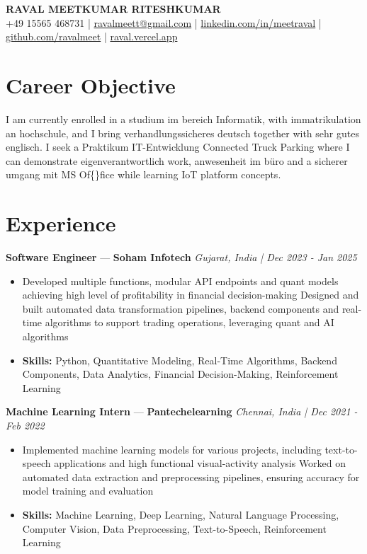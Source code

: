 \documentclass[a4paper,10pt]{article}
\begin{document}
\begin{center}
  {\Large\bfseries RAVAL MEETKUMAR RITESHKUMAR}\\[2pt]
  {\small +49 15565 468731 \;|\; \href{mailto:ravalmeett@gmail.com}{ravalmeett@gmail.com} \;|\; \href{https://www.linkedin.com/in/meetraval/}{linkedin.com/in/meetraval} \;|\; \href{https://github.com/ravalmeet}{github.com/ravalmeet} \;|\; \href{https://raval.vercel.app/}{raval.vercel.app}}
\end{center}
\vspace{-3pt}

\section*{Career Objective}
I am currently enrolled in a studium im bereich Informatik, with immatrikulation an hochschule, and I bring verhandlungssicheres deutsch together with sehr gutes englisch. I seek a Praktikum IT-Entwicklung Connected Truck Parking where I can demonstrate eigenverantwortlich work, anwesenheit im büro and a sicherer umgang mit MS Of\{\}fice while learning IoT platform concepts.\par

\section*{Experience}
\textbf{Software Engineer} — \textbf{Soham Infotech} \hfill \textit{Gujarat, India \;|\; Dec 2023 - Jan 2025}\par
\vspace{1pt}
\begin{itemize}
  \item Developed multiple functions, modular API endpoints and quant models achieving high level of profitability in financial decision-making Designed and built automated data transformation pipelines, backend components and real-time algorithms to support trading operations, leveraging quant and AI algorithms
  \item \textbf{Skills:} Python, Quantitative Modeling, Real-Time Algorithms, Backend Components, Data Analytics, Financial Decision-Making, Reinforcement Learning
\end{itemize}
\vspace{3pt}
\textbf{Machine Learning Intern} — \textbf{Pantechelearning} \hfill \textit{Chennai, India \;|\; Dec 2021 - Feb 2022}\par
\vspace{1pt}
\begin{itemize}
  \item Implemented machine learning models for various projects, including text-to-speech applications and high functional visual-activity analysis Worked on automated data extraction and preprocessing pipelines, ensuring accuracy for model training and evaluation
  \item \textbf{Skills:} Machine Learning, Deep Learning, Natural Language Processing, Computer Vision, Data Preprocessing, Text-to-Speech, Reinforcement Learning
\end{itemize}
\end{document}

